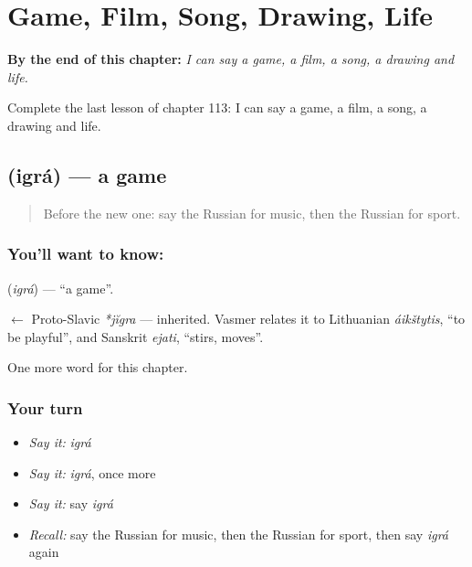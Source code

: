 
\chapter{Game, Film, Song, Drawing, Life}
\label{ch:ru-game-film-song-drawing-life}

\begin{chapteropening}
\textbf{By the end of this chapter:} \emph{I can say a game, a film, a song, a drawing and life.}

Complete the last lesson of chapter 113: I can say a game, a film, a song, a drawing and life.
\end{chapteropening}

\section[\texorpdfstring{\ru{игра} (igrá)}{игра (igrá)}]{ (igrá) — a game}

\label{lesson:RU-C113-game}



\begin{quote}
Before the new one: say the Russian for music, then the Russian for sport.
\end{quote}

\subsection*{You'll want to know: }
\textbf{} (\emph{igrá}) — \textquotedblleft{}a game\textquotedblright{}.

\begin{cousinweb}
\textbf{} $\leftarrow$ Proto-Slavic \emph{*jĭgra} — inherited. Vasmer relates it to Lithuanian \emph{áikštytis}, \textquotedblleft{}to be playful\textquotedblright{}, and Sanskrit \emph{ejati}, \textquotedblleft{}stirs, moves\textquotedblright{}.
\end{cousinweb}

\begin{grammarlens}[title={What you've built}]
One more word for this chapter.
\end{grammarlens}

\subsection*{Your turn}
\begin{itemize}
\raggedright
  \item \emph{Say it:} \emph{igrá}
  \item \emph{Say it:} \emph{igrá}, once more
  \item \emph{Say it:} say \emph{igrá}
  \item \emph{Recall:} say the Russian for music, then the Russian for sport, then say \emph{igrá} again
\end{itemize}

